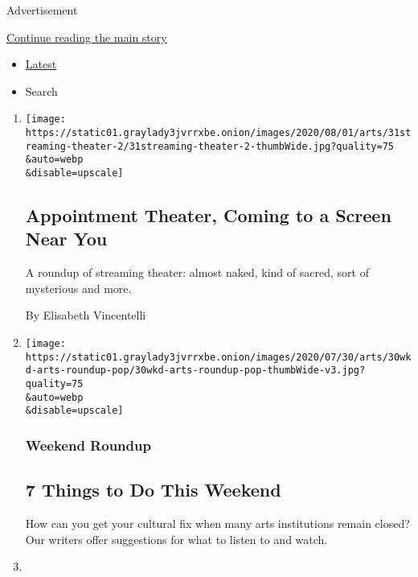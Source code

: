 Advertisement

\protect\hyperlink{after-mid1}{Continue reading the main story}

\begin{itemize}
\tightlist
\item
  \protect\hyperlink{stream-panel}{Latest}
\item
  Search
\end{itemize}

\begin{enumerate}
\def\labelenumi{\arabic{enumi}.}
\item
  \href{/2020/07/30/theater/streaming-theater-online.html}{}

  \texttt{[image: https://static01.graylady3jvrrxbe.onion/images/2020/08/01/arts/31streaming-theater-2/31streaming-theater-2-thumbWide.jpg?quality=75\\\&auto=webp\\\&disable=upscale]}

  \hypertarget{appointment-theater-coming-to-a-screen-near-you}{%
  \subsection{Appointment Theater, Coming to a Screen Near
  You}\label{appointment-theater-coming-to-a-screen-near-you}}

  A roundup of streaming theater: almost naked, kind of sacred, sort of
  mysterious and more.

  By Elisabeth Vincentelli
\item
  \href{/2020/07/30/arts/things-to-do-weekend-coronavirus.html}{}

  \texttt{[image: https://static01.graylady3jvrrxbe.onion/images/2020/07/30/arts/30wkd-arts-roundup-pop/30wkd-arts-roundup-pop-thumbWide-v3.jpg?quality=75\\\&auto=webp\\\&disable=upscale]}

  \hypertarget{weekend-roundup}{%
  \subsubsection{Weekend Roundup}\label{weekend-roundup}}

  \hypertarget{7-things-to-do-this-weekend}{%
  \subsection{7 Things to Do This
  Weekend}\label{7-things-to-do-this-weekend}}

  How can you get your cultural fix when many arts institutions remain
  closed? Our writers offer suggestions for what to listen to and watch.
\item
  \href{/2020/07/28/arts/alan-menken-egot.html}{}


\end{enumerate}
